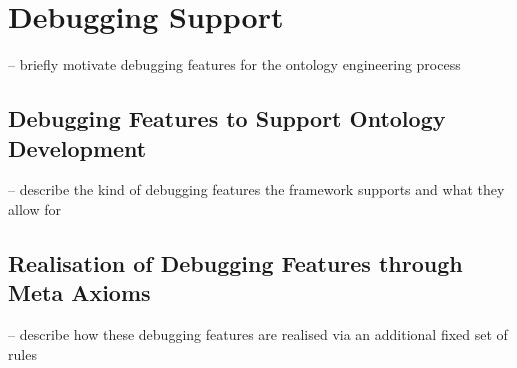 \section{Debugging Support\label{sec:debugging}}
-- briefly motivate debugging features for the ontology engineering process \\

\subsection{Debugging Features to Support Ontology Development}
-- describe the kind of debugging features the framework supports and what they allow for \\

\subsection{Realisation of Debugging Features through Meta Axioms}
-- describe how these debugging features are realised via an additional fixed set of rules \\
